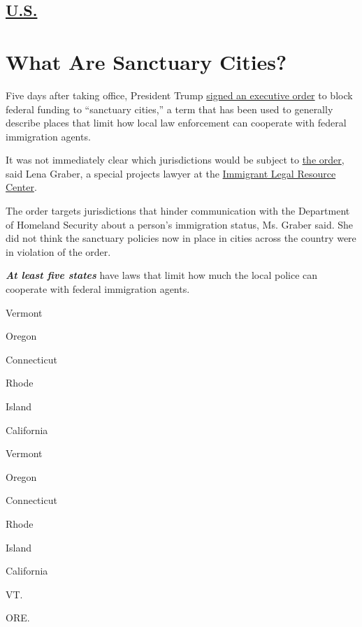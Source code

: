 \hypertarget{-us-}{%
\subsection{\texorpdfstring{
\href{https://www.nytimes3xbfgragh.onion/section/us}{U.S.}
}{ U.S. }}\label{-us-}}

\hypertarget{what-are-sanctuary-cities}{%
\section{What Are Sanctuary Cities?}\label{what-are-sanctuary-cities}}

Five days after taking office, President Trump
\href{https://www.nytimes3xbfgragh.onion/2017/01/25/nyregion/outraged-mayors-vow-to-defy-trumps-immigration-order.html}{signed
an executive order} to block federal funding to ``sanctuary cities,'' a
term that has been used to generally describe places that limit how
local law enforcement can cooperate with federal immigration agents.

It was not immediately clear which jurisdictions would be subject to
\href{https://www.whitehouse.gov/the-press-office/2017/01/25/presidential-executive-order-enhancing-public-safety-interior-united}{the
order}, said Lena Graber, a special projects lawyer at the
\href{https://www.ilrc.org/}{Immigrant Legal Resource Center}.

The order targets jurisdictions that hinder communication with the
Department of Homeland Security about a person's immigration status, Ms.
Graber said. She did not think the sanctuary policies now in place in
cities across the country were in violation of the order.

\emph{\textbf{At least five states}} have laws that limit how much the
local police can cooperate with federal immigration agents.

Vermont

Oregon

Connecticut

Rhode

Island

California

Vermont

Oregon

Connecticut

Rhode

Island

California

VT.

ORE.


